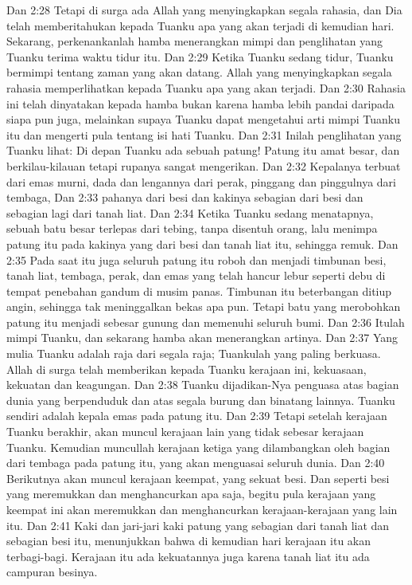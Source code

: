 Dan 2:28  Tetapi di surga ada Allah yang menyingkapkan segala rahasia, dan Dia telah memberitahukan kepada Tuanku apa yang akan terjadi di kemudian hari. Sekarang, perkenankanlah hamba menerangkan mimpi dan penglihatan yang Tuanku terima waktu tidur itu.
Dan 2:29  Ketika Tuanku sedang tidur, Tuanku bermimpi tentang zaman yang akan datang. Allah yang menyingkapkan segala rahasia memperlihatkan kepada Tuanku apa yang akan terjadi.
Dan 2:30  Rahasia ini telah dinyatakan kepada hamba bukan karena hamba lebih pandai daripada siapa pun juga, melainkan supaya Tuanku dapat mengetahui arti mimpi Tuanku itu dan mengerti pula tentang isi hati Tuanku.
Dan 2:31  Inilah penglihatan yang Tuanku lihat: Di depan Tuanku ada sebuah patung! Patung itu amat besar, dan berkilau-kilauan tetapi rupanya sangat mengerikan.
Dan 2:32  Kepalanya terbuat dari emas murni, dada dan lengannya dari perak, pinggang dan pinggulnya dari tembaga,
Dan 2:33  pahanya dari besi dan kakinya sebagian dari besi dan sebagian lagi dari tanah liat.
Dan 2:34  Ketika Tuanku sedang menatapnya, sebuah batu besar terlepas dari tebing, tanpa disentuh orang, lalu menimpa patung itu pada kakinya yang dari besi dan tanah liat itu, sehingga remuk.
Dan 2:35  Pada saat itu juga seluruh patung itu roboh dan menjadi timbunan besi, tanah liat, tembaga, perak, dan emas yang telah hancur lebur seperti debu di tempat penebahan gandum di musim panas. Timbunan itu beterbangan ditiup angin, sehingga tak meninggalkan bekas apa pun. Tetapi batu yang merobohkan patung itu menjadi sebesar gunung dan memenuhi seluruh bumi.
Dan 2:36  Itulah mimpi Tuanku, dan sekarang hamba akan menerangkan artinya.
Dan 2:37  Yang mulia Tuanku adalah raja dari segala raja; Tuankulah yang paling berkuasa. Allah di surga telah memberikan kepada Tuanku kerajaan ini, kekuasaan, kekuatan dan keagungan.
Dan 2:38  Tuanku dijadikan-Nya penguasa atas bagian dunia yang berpenduduk dan atas segala burung dan binatang lainnya. Tuanku sendiri adalah kepala emas pada patung itu.
Dan 2:39  Tetapi setelah kerajaan Tuanku berakhir, akan muncul kerajaan lain yang tidak sebesar kerajaan Tuanku. Kemudian muncullah kerajaan ketiga yang dilambangkan oleh bagian dari tembaga pada patung itu, yang akan menguasai seluruh dunia.
Dan 2:40  Berikutnya akan muncul kerajaan keempat, yang sekuat besi. Dan seperti besi yang meremukkan dan menghancurkan apa saja, begitu pula kerajaan yang keempat ini akan meremukkan dan menghancurkan kerajaan-kerajaan yang lain itu.
Dan 2:41  Kaki dan jari-jari kaki patung yang sebagian dari tanah liat dan sebagian besi itu, menunjukkan bahwa di kemudian hari kerajaan itu akan terbagi-bagi. Kerajaan itu ada kekuatannya juga karena tanah liat itu ada campuran besinya.
